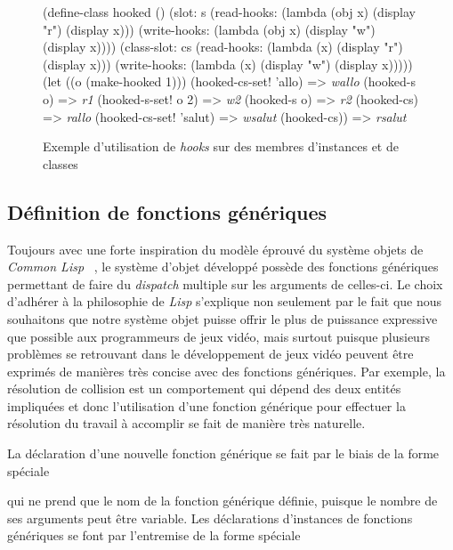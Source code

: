 \documentclass[12pt,oneside,letterpaper,francais]{book}
\newcommand{\lisp}{{\textit{Lisp }}}
\newcommand{\clisp}{{\textit{Common Lisp }}}
\newcommand{\scheme}[1]{\selectlanguage{english}{\tt #1}\selectlanguage{french}}
\newcommand{\schemeresult}[1]{{\it #1}}
\begin{document}
\begin{figure}[htb1]
  \begin{schemecode}
(define-class hooked ()
  (slot: s
    (read-hooks:  (lambda (obj x) (display "r") (display x)))
    (write-hooks: (lambda (obj x) (display "w") (display x))))
  (class-slot: cs
    (read-hooks:  (lambda (x) (display "r") (display x)))
    (write-hooks: (lambda (x) (display "w") (display x)))))
(let ((o (make-hooked 1))) 
  (hooked-cs-set! 'allo)   => \schemeresult{wallo}
  (hooked-s o)             => \schemeresult{r1}
  (hooked-s-set! o 2)      => \schemeresult{w2}
  (hooked-s o)             => \schemeresult{r2}
  (hooked-cs)              => \schemeresult{rallo}
  (hooked-cs-set! 'salut)  => \schemeresult{wsalut}
  (hooked-cs))             => \schemeresult{rsalut}
  \end{schemecode}
  \caption{Exemple d'utilisation de \textit{hooks} sur des membres
    d'instances et de classes}
  \label{OO:hooks}
\end{figure}



\subsection{Définition de fonctions génériques}
\label{OO:genfun}

Toujours avec une forte inspiration du modèle éprouvé du système
objets de \clisp~\cite{CLOS}, le système d'objet développé possède des
fonctions génériques permettant de faire du \textit{dispatch} multiple
sur les arguments de celles-ci. Le choix d'adhérer à la philosophie de
\lisp s'explique non seulement par le fait que nous souhaitons que
notre système objet puisse offrir le plus de puissance expressive que
possible aux programmeurs de jeux vidéo, mais surtout puisque
plusieurs problèmes se retrouvant dans le développement de jeux vidéo
peuvent être exprimés de manières très concise avec des fonctions
génériques. Par exemple, la résolution de collision est un
comportement qui dépend des deux entités impliquées et donc
l'utilisation d'une fonction générique pour effectuer la résolution du
travail à accomplir se fait de manière très naturelle.

La déclaration d'une nouvelle fonction générique se fait par le biais
de la forme spéciale

 \scheme{(define-generic <gen-fun-name>)} 

\noindent
qui ne prend que le nom de la fonction générique définie, puisque le
nombre de ses arguments peut être variable. Les déclarations
d'instances de fonctions génériques se font par l'entremise de la
forme spéciale
\end{document}
